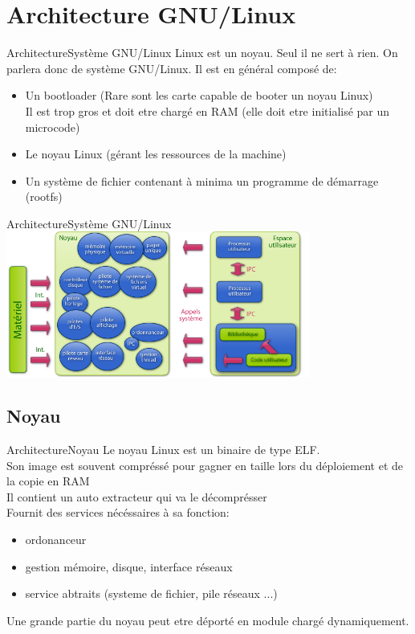 \section{Architecture GNU/Linux}

\begin{frame}{Architecture}{Système GNU/Linux}
	Linux est un noyau. Seul il ne sert à rien. On parlera donc de système GNU/Linux.
	Il est en général composé de:
	\begin{itemize}
		\item
			Un bootloader (Rare sont les carte capable de booter un noyau Linux)\\
			Il est trop gros et doit etre chargé en RAM (elle doit etre initialisé par un microcode)
		\item
			Le noyau Linux (gérant les ressources de la machine)
		\item
			Un système de fichier contenant à minima un programme de démarrage (rootfs)
	\end{itemize}
\end{frame}

\begin{frame}{Architecture}{Système GNU/Linux}
	\includegraphics[width=10cm]{system_arch.png}
\end{frame}

\subsection{Noyau}
\begin{frame}{Architecture}{Noyau}
	Le noyau Linux est un binaire de type ELF.\\
	Son image est souvent compréssé pour gagner en taille lors du déploiement et de la copie en RAM\\
	Il contient un auto extracteur qui va le décomprésser\\
	Fournit des services nécéssaires à sa fonction:
	\begin{itemize}
		\item
			ordonanceur
		\item
			gestion mémoire, disque, interface réseaux
		\item
			service abtraits (systeme de fichier, pile réseaux ...)
	\end{itemize}
	Une grande partie du noyau peut etre déporté en module chargé dynamiquement.
\end{frame}

